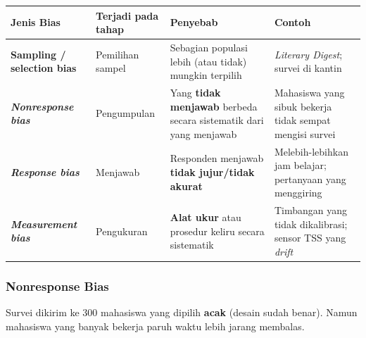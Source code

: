 \documentclass[
  indonesian,
  letterpaper,
]{book}
\newcounter{none} %
\begin{document}
{\def\LTcaptype{none} %
\begin{longtable}[]{@{}
  >{\raggedright\arraybackslash}p{}
  >{\raggedright\arraybackslash}p{}
  >{\raggedright\arraybackslash}p{}
  >{\raggedright\arraybackslash}p{}@{}}
\toprule\noalign{}
\begin{minipage}[b]{\linewidth}\raggedright
Jenis Bias
\end{minipage} & \begin{minipage}[b]{\linewidth}\raggedright
Terjadi pada tahap
\end{minipage} & \begin{minipage}[b]{\linewidth}\raggedright
Penyebab
\end{minipage} & \begin{minipage}[b]{\linewidth}\raggedright
Contoh
\end{minipage} \\
\midrule\noalign{}
\endhead
\bottomrule\noalign{}
\endlastfoot
\textbf{Sampling / selection bias} & Pemilihan sampel & Sebagian
populasi lebih (atau tidak) mungkin terpilih & \emph{Literary Digest};
survei di kantin \\
\textbf{\emph{Nonresponse bias}} & Pengumpulan & Yang \textbf{tidak
menjawab} berbeda secara sistematik dari yang menjawab & Mahasiswa yang
sibuk bekerja tidak sempat mengisi survei \\
\textbf{\emph{Response bias}} & Menjawab & Responden menjawab
\textbf{tidak jujur/tidak akurat} & Melebih-lebihkan jam belajar;
pertanyaan yang menggiring \\
\textbf{\emph{Measurement bias}} & Pengukuran & \textbf{Alat ukur} atau
prosedur keliru secara sistematik & Timbangan yang tidak dikalibrasi;
sensor TSS yang \emph{drift} \\
\end{longtable}
}

\subsubsection{Nonresponse Bias}\label{nonresponse-bias}

Survei dikirim ke 300 mahasiswa yang dipilih \textbf{acak} (desain sudah
benar). Namun mahasiswa yang banyak bekerja paruh waktu lebih jarang
membalas.
\end{document}
